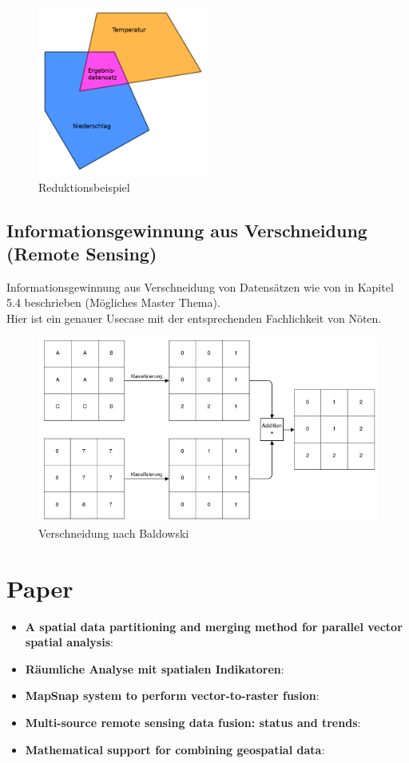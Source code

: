 \begin{figure}[H]
	\includegraphics[width=0.5\textwidth]{res/Reduktionsbeispiel}
	\caption{Reduktionsbeispiel}
	\label{fig:Reduktionsbeispiel}
\end{figure}


\subsection{Informationsgewinnung aus Verschneidung (Remote Sensing)}
Informationsgewinnung aus Verschneidung von Datensätzen wie von \cite{Baldowski2014} in Kapitel 5.4 beschrieben (Mögliches Master Thema).\\
Hier ist ein genauer Usecase mit der entsprechenden Fachlichkeit von Nöten.

\begin{figure}[H]
	\includegraphics[width=.75\textwidth]{res/Verschneidung}
	\caption{Verschneidung nach Baldowski}
	\label{fig:Verschneidung}
\end{figure}


\section{Paper}
\begin{itemize}
	\item \textbf{A spatial data partitioning and merging method for parallel vector spatial analysis}: \cite{Qiu2015}
	\item \textbf{Räumliche Analyse mit spatialen Indikatoren}: \cite{Baldowski2014}
	\item \textbf{MapSnap system to perform vector-to-raster fusion}: \cite{Kovalerchuk2011}
	\item \textbf{Multi-source remote sensing data fusion: status and trends}: \cite{Zhang2010}
	\item \textbf{Mathematical support for combining geospatial data}: \cite{Kovalerchuk2001}
\end{itemize}
